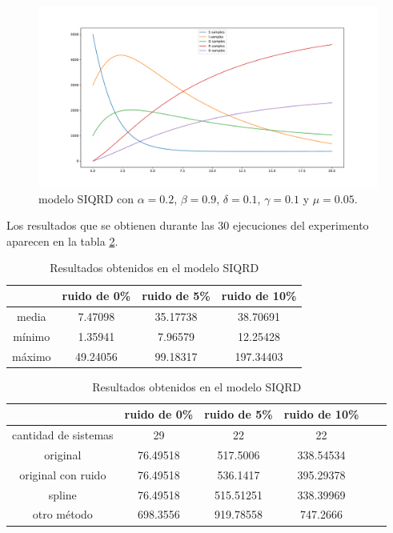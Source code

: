 \begin{figure}[h]
    \centering
    \includegraphics[width=\textwidth]{"figures/SIQRD.pdf"}
    \caption{modelo SIQRD con $\alpha = 0.2$, $\beta = 0.9$, $\delta = 0.1$, $\gamma = 0.1$ y $\mu = 0.05$.}
    \label{fig:SIQRD}
\end{figure}

Los resultados que se obtienen durante las 30 ejecuciones del experimento aparecen en la tabla \ref{table:experiment_SIQRD}.

\begin{table}[!h]
    \centering
    \caption{Resultados obtenidos en el modelo SIQRD}
    \begin{tabular}{|c|c|c|c|}
        \hline
               & \textbf{ruido de 0\%} & \textbf{ruido de 5\%} & \textbf{ruido de 10\%} \\
        \hline
        media  & 7.47098               & 35.17738              & 38.70691               \\
        \hline
        mínimo & 1.35941               & 7.96579               & 12.25428               \\
        \hline
        máximo & 49.24056              & 99.18317              & 197.34403              \\
        \hline
    \end{tabular}

    \begin{tabular}{|c|c|c|c|c|c|}
        \hline
                             & \textbf{ruido de 0\%} & \textbf{ruido de 5\%} & \textbf{ruido de 10\%} \\
        \hline
        cantidad de sistemas & 29                    & 22                    & 22                     \\
        \hline
        original             & 76.49518              & 517.5006              & 338.54534              \\
        \hline
        original con ruido   & 76.49518              & 536.1417              & 395.29378              \\
        \hline
        spline               & 76.49518              & 515.51251             & 338.39969              \\
        \hline
        otro método          & 698.3556              & 919.78558             & 747.2666               \\
        \hline
    \end{tabular}
    \label{table:experiment_SIQRD}
\end{table}

